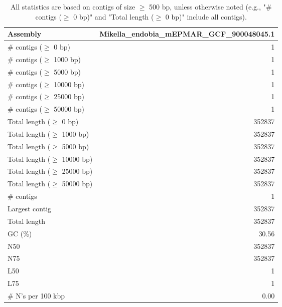 \documentclass[12pt,a4paper]{article}
\begin{document}
\begin{table}[ht]
\begin{center}
\caption{All statistics are based on contigs of size $\geq$ 500 bp, unless otherwise noted (e.g., "\# contigs ($\geq$ 0 bp)" and "Total length ($\geq$ 0 bp)" include all contigs).}
\begin{tabular}{|l*{1}{|r}|}
\hline
Assembly & Mikella\_endobia\_mEPMAR\_GCF\_900048045.1 \\ \hline
\# contigs ($\geq$ 0 bp) & 1 \\ \hline
\# contigs ($\geq$ 1000 bp) & 1 \\ \hline
\# contigs ($\geq$ 5000 bp) & 1 \\ \hline
\# contigs ($\geq$ 10000 bp) & 1 \\ \hline
\# contigs ($\geq$ 25000 bp) & 1 \\ \hline
\# contigs ($\geq$ 50000 bp) & 1 \\ \hline
Total length ($\geq$ 0 bp) & 352837 \\ \hline
Total length ($\geq$ 1000 bp) & 352837 \\ \hline
Total length ($\geq$ 5000 bp) & 352837 \\ \hline
Total length ($\geq$ 10000 bp) & 352837 \\ \hline
Total length ($\geq$ 25000 bp) & 352837 \\ \hline
Total length ($\geq$ 50000 bp) & 352837 \\ \hline
\# contigs & 1 \\ \hline
Largest contig & 352837 \\ \hline
Total length & 352837 \\ \hline
GC (\%) & 30.56 \\ \hline
N50 & 352837 \\ \hline
N75 & 352837 \\ \hline
L50 & 1 \\ \hline
L75 & 1 \\ \hline
\# N's per 100 kbp & 0.00 \\ \hline
\end{tabular}
\end{center}
\end{table}
\end{document}
